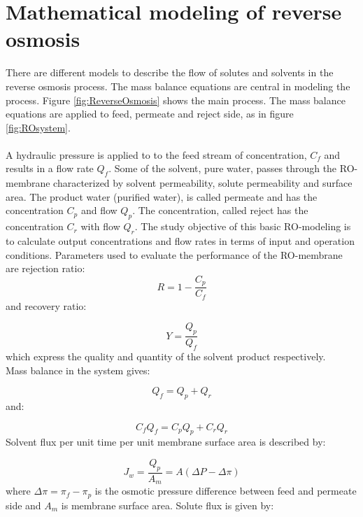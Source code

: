 \section{Mathematical modeling of reverse osmosis} 
\label{sec:soldiff}
There are different models to describe the flow of solutes and solvents in the reverse osmosis process. The mass balance equations are central in modeling the process. Figure \ref{fig:ReverseOsmosis} shows the main process. The mass balance equations are applied to feed, permeate and reject side, as in figure \ref{fig:ROsystem}. \\
\\
A hydraulic pressure is applied to to the feed stream of concentration, $C_{f}$ and results in a flow rate $Q_{f}$. Some of the solvent, pure water, passes through the RO-membrane characterized by solvent permeability, solute permeability and surface area. The product water (purified water), is called permeate and has the concentration $C_p$ and flow $Q_p$. The concentration, called reject has the concentration $C_r$ with flow $Q_r$. The study objective of this basic RO-modeling is to calculate output concentrations and flow rates in terms of input and operation conditions. Parameters used to evaluate the performance of the RO-membrane are rejection ratio:
\begin{equation}
\label{eq:rejection}
R=1-\frac{C_{p}}{C_{f}}
\end{equation}
and recovery ratio:

\begin{equation}
\label{eq:recovery}
Y=\frac{Q_{p}}{Q_{f}}
\end{equation}
which express the quality and quantity of the solvent product respectively. 
\\Mass balance in the system gives:

\begin{equation}
\label{eq:feedflow}
Q_{f}=Q_{p}+Q_{r}
\end{equation}
and:

\begin{equation}
\label{eq:mass}
C_{f}Q_{f}=C_{p}Q_{p}+C_{r}Q_{r}
\end{equation}
Solvent flux per unit time per unit membrane surface area is described by:

\begin{equation}
\label{eq:flux}
J_{w}=\frac{Q_{p}}{A_{m}}= A(\Delta P - \Delta \pi)
\end{equation}
where $\Delta\pi = \pi_{f} - \pi_{p}$ is the osmotic pressure difference between feed and permeate side and $A_{m}$ is membrane surface area.
Solute flux is given by:


